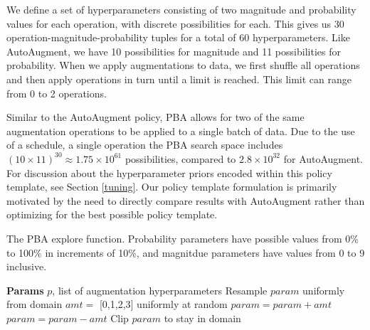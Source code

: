 \documentclass{article}
\begin{document}
We define a set of hyperparameters consisting of two magnitude and probability values for each operation, with discrete possibilities for each. This gives us 30 operation-magnitude-probability tuples for a total of 60 hyperparameters. Like AutoAugment, we have 10 possibilities for magnitude and 11 possibilities for probability. When we apply augmentations to data, we first shuffle all operations and then apply operations in turn until a limit is reached. This limit can range from 0 to 2 operations.

Similar to the AutoAugment policy, PBA allows for two of the same augmentation operations to be applied to a single batch of data. Due to the use of a schedule, a single operation the PBA search space includes $(10 \times 11)^{30} \approx 1.75 \times 10^{61}$ possibilities, compared to $2.8 \times 10^{32}$ for AutoAugment. For discussion about the hyperparameter priors encoded within this policy template, see Section \ref{tuning}. Our policy template formulation is primarily motivated by the need to directly compare results with AutoAugment rather than optimizing for the best possible policy template.

\begin{algorithm}[tb]
  \caption{The PBA explore function. Probability parameters have possible values from 0\% to 100\% in increments of 10\%, and magnitdue parameters have values from 0 to 9 inclusive.}
  \label{alg:pbt-explore}
\begin{algorithmic}
   \textbf{Params} $p$, list of augmentation hyperparameters
  \STATE Resample $param$ uniformly from domain
  \ELSE
  \STATE $amt = $ [0,1,2,3] uniformly at random
      \STATE $param = param + amt$
      \ELSE
      \STATE $param = param - amt$
      \ENDIF
      \STATE Clip $param$ to stay in domain
  \ENDIF
  
  \ENDFOR
\end{algorithmic}
\end{algorithm}
\end{document}
